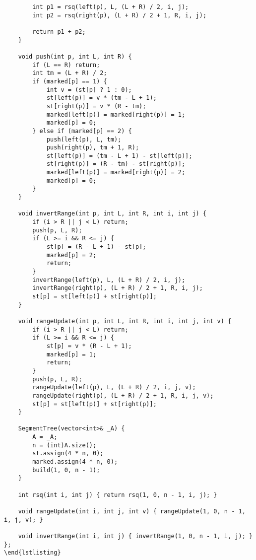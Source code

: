 \documentclass[11pt]{article}
\begin{document}
\begin{verbatim}
        int p1 = rsq(left(p), L, (L + R) / 2, i, j);
        int p2 = rsq(right(p), (L + R) / 2 + 1, R, i, j);

        return p1 + p2;
    }

    void push(int p, int L, int R) {
        if (L == R) return;
        int tm = (L + R) / 2;
        if (marked[p] == 1) {
            int v = (st[p] ? 1 : 0);
            st[left(p)] = v * (tm - L + 1);
            st[right(p)] = v * (R - tm);
            marked[left(p)] = marked[right(p)] = 1;
            marked[p] = 0;
        } else if (marked[p] == 2) {
            push(left(p), L, tm);
            push(right(p), tm + 1, R);
            st[left(p)] = (tm - L + 1) - st[left(p)];
            st[right(p)] = (R - tm) - st[right(p)];
            marked[left(p)] = marked[right(p)] = 2;
            marked[p] = 0;
        }
    }

    void invertRange(int p, int L, int R, int i, int j) {
        if (i > R || j < L) return;
        push(p, L, R);
        if (L >= i && R <= j) {
            st[p] = (R - L + 1) - st[p];
            marked[p] = 2;
            return;
        }
        invertRange(left(p), L, (L + R) / 2, i, j);
        invertRange(right(p), (L + R) / 2 + 1, R, i, j);
        st[p] = st[left(p)] + st[right(p)];
    }

    void rangeUpdate(int p, int L, int R, int i, int j, int v) {
        if (i > R || j < L) return;
        if (L >= i && R <= j) {
            st[p] = v * (R - L + 1);
            marked[p] = 1;
            return;
        }
        push(p, L, R);
        rangeUpdate(left(p), L, (L + R) / 2, i, j, v);
        rangeUpdate(right(p), (L + R) / 2 + 1, R, i, j, v);
        st[p] = st[left(p)] + st[right(p)];
    }

    SegmentTree(vector<int>& _A) {
        A = _A;
        n = (int)A.size();
        st.assign(4 * n, 0);
        marked.assign(4 * n, 0);
        build(1, 0, n - 1);
    }

    int rsq(int i, int j) { return rsq(1, 0, n - 1, i, j); }

    void rangeUpdate(int i, int j, int v) { rangeUpdate(1, 0, n - 1, i, j, v); }

    void invertRange(int i, int j) { invertRange(1, 0, n - 1, i, j); }
};
\end{lstlisting}
\end{verbatim}
\end{document}
